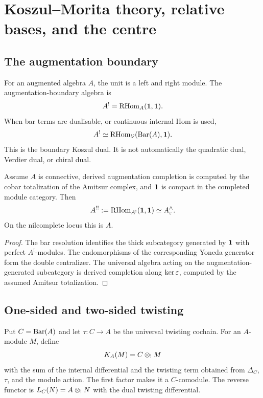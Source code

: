\chapter{Koszul--Morita theory, relative bases, and the centre}\label{chap:morita}

\section{The augmentation boundary}
For an augmented algebra \(A\), the unit is a left and right module.  The augmentation-boundary algebra is
\[
 A^!=\operatorname{RHom}_A(\mathbf 1,\mathbf 1).
\]
When bar terms are dualisable, or continuous internal Hom is used,
\[
 A^!\simeq\operatorname{RHom}_{\mathcal V}(\operatorname{Bar}(A),\mathbf 1).
\]
This is the boundary Koszul dual.  It is not automatically the quadratic dual, Verdier dual, or chiral dual.

\begin{theorem}\label{thm:double-centralizer}
Assume \(A\) is connective, derived augmentation completion is computed by the cobar totalization of the Amitsur complex, and \(\mathbf 1\) is compact in the completed module category.  Then
\[
 A^{!!}:=\operatorname{RHom}_{A^!}(\mathbf 1,\mathbf 1)
 \simeq A^{\wedge}_\varepsilon.
\]
On the nilcomplete locus this is \(A\).
\end{theorem}
\begin{proof}
The bar resolution identifies the thick subcategory generated by \(\mathbf 1\) with perfect \(A^!\)-modules.  The endomorphisms of the corresponding Yoneda generator form the double centralizer.  The universal algebra acting on the augmentation-generated subcategory is derived completion along \(\ker\varepsilon\), computed by the assumed Amitsur totalization.
\end{proof}

\section{One-sided and two-sided twisting}
Put \(C=\operatorname{Bar}(A)\) and let \(\tau:C\to A\) be the universal twisting cochain.  For an \(A\)-module \(M\), define
\[
 K_A(M)=C\mathbin{\otimes_{!}} M
\]
with the sum of the internal differential and the twisting term obtained from \(\Delta_C\), \(\tau\), and the module action.  The first factor makes it a \(C\)-comodule.  The reverse functor is \(L_C(N)=A\mathbin{\otimes_{!}} N\) with the dual twisting differential.

